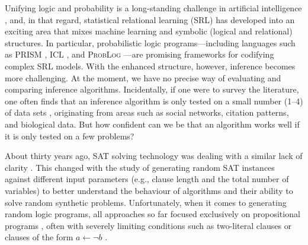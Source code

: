\documentclass[runningheads]{llncs}
\begin{document}
Unifying logic and probability is a long-standing challenge in artificial
intelligence \cite{DBLP:journals/cacm/Russell15}, and, in that regard,
statistical relational learning (SRL) has developed into an exciting area that
mixes machine learning and symbolic (logical and relational) structures. In
particular, probabilistic logic programs---including languages such as
\textsc{PRISM} \cite{DBLP:conf/ijcai/SatoK97}, \textsc{ICL}
\cite{DBLP:journals/ai/Poole97}, and \textsc{ProbLog}
\cite{DBLP:conf/ijcai/RaedtKT07}---are promising frameworks for codifying
complex SRL models. With the enhanced structure, however, inference becomes more
challenging. At the moment, we have no precise way of evaluating and comparing
inference algorithms. Incidentally, if one were to survey the literature, one
often finds that an inference algorithm is only tested on a small number (1--4)
of data sets
\cite{DBLP:conf/ecai/BruynoogheMKGVJR10,DBLP:journals/tplp/KimmigDRCR11,DBLP:conf/ijcai/VlasselaerBKMR15},
originating from areas such as social networks, citation patterns, and
biological data. But how confident can we be that an algorithm works well if it
is only tested on a few problems?

About thirty years ago, SAT solving technology was dealing with a similar lack
of clarity \cite{DBLP:journals/ai/SelmanML96}. This changed with the study of
generating random SAT instances against different input parameters (e.g.,
clause length and the total number of variables) to better understand the
behaviour of algorithms and their ability to solve random synthetic problems.
Unfortunately, when it comes to generating random logic programs, all approaches
so far focused exclusively on propositional programs
\cite{DBLP:conf/ijcai/AmendolaRT17,DBLP:journals/ai/AmendolaRT20,DBLP:journals/tplp/WangWM15,DBLP:conf/iclp/ZhaoL03},
often with severely limiting conditions such as two-literal clauses
\cite{DBLP:conf/iclp/Namasivayam09,DBLP:conf/lpnmr/NamasivayamT09} or clauses of
the form $a \gets \neg b$ \cite{DBLP:journals/tocl/WenWSL16}.
\end{document}
